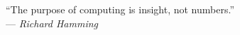 \medskip




\begin{flushright}
    ``The purpose of computing is insight, not numbers.''\\
    \medskip
    --- \textit{Richard Hamming}
\end{flushright}




